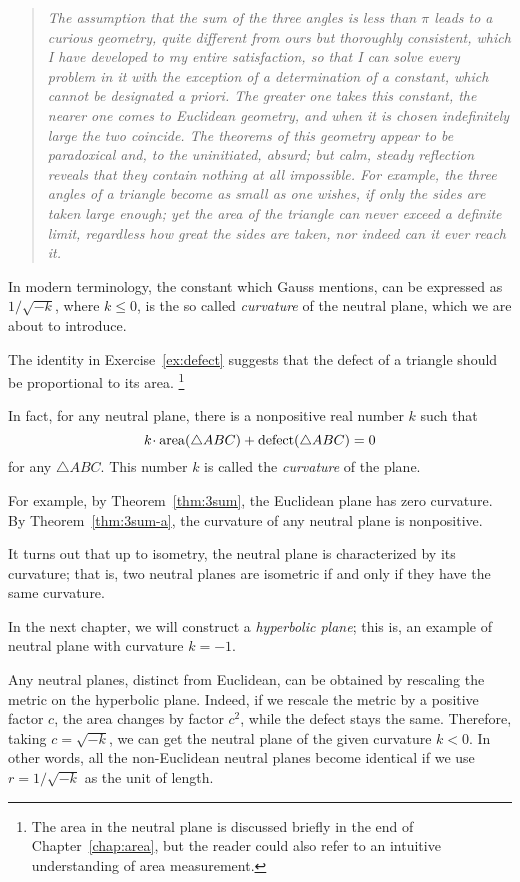 \begin{quotation}{\it
The assumption that the sum of the three angles is less than $\pi$ leads to a curious geometry, 
quite different from ours but thoroughly consistent, 
which I have developed to my entire satisfaction, 
so that I can solve every problem in it with the exception of a determination of a constant, which cannot be designated a priori. 
The greater one takes this constant, the nearer one comes to Euclidean geometry, 
and when it is chosen indefinitely large the two coincide.
The theorems of this geometry appear to be paradoxical and, 
to the uninitiated, absurd; but calm, steady reflection reveals that they contain nothing at all impossible. 
For example, the three angles of a triangle become as small as one wishes, if only the sides are taken large enough; 
yet the area of the triangle can never exceed a definite limit, regardless how great the sides are taken, 
nor indeed can it ever reach it.}
\end{quotation} 

In modern terminology, the constant which Gauss mentions, 
can be expressed as $1/\sqrt{-k}$, 
where $k\le 0$, is the so called \emph{curvature} of the neutral plane, which we are about to introduce.

The identity in Exercise~\ref{ex:defect} suggests that the defect of a triangle should be proportional to its area.%
\footnote{The area in the neutral plane is discussed briefly in the end of Chapter~\ref{chap:area},
but the reader could also refer to an intuitive understanding of area measurement.}

In fact, for any neutral plane, there is a nonpositive real number $k$
such that 
$$k\cdot\area(\triangle ABC)+\defect(\triangle ABC)=0$$
for any $\triangle ABC$.
This number $k$ is called the \emph{curvature} of the plane.

For example, by Theorem~\ref{thm:3sum}, the Euclidean plane has zero curvature.
By Theorem~\ref{thm:3sum-a}, the curvature of any neutral plane is nonpositive.

It turns out that up to isometry, the neutral plane is characterized by its curvature;
that is, two neutral planes are isometric if and only if they have the same curvature. 

In the next chapter, we will construct a \emph{hyperbolic plane};
this is, an example of neutral plane with curvature $k=-1$.

Any neutral planes, distinct from Euclidean,
can be obtained by rescaling the metric on the hyperbolic plane.
Indeed,
if we rescale the metric by a positive factor $c$,
the area changes by factor $c^2$, while the defect stays the same.
Therefore, taking $c=\sqrt{-k}$,
we can get the neutral plane of the given curvature $k<0$.
In other words, all the non-Euclidean neutral planes become identical
if we use $r=1/\sqrt{-k}$ as the unit of length.

